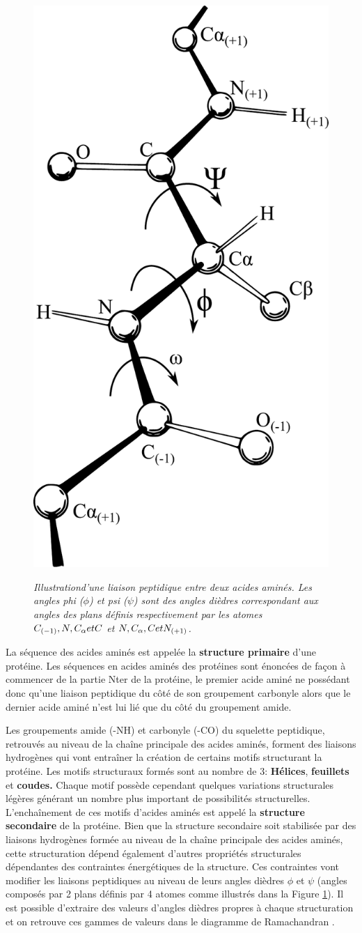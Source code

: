 

\begin{figure}
  \centering
  {\includegraphics[width=0.3\linewidth]{./figures/ch1/phi_psi.pdf}}
    \caption{\it Illustration\protect\footnotemark d'une liaison peptidique entre deux acides aminés. Les angles phi ($\phi$) et psi ($\psi$) sont des angles dièdres correspondant aux angles des plans définis respectivement par les atomes $ C_{(-1)}, N, C_\protect\alpha et C$ et $N, C_\protect\alpha, C et N_{(+1)}$.}
    \label{Fig:phi_psi}
  \hspace{0.3cm}
\end{figure}


La séquence des acides aminés est appelée la \textbf{structure primaire} d'une protéine. Les séquences en acides aminés des protéines sont énoncées de façon à commencer de la partie Nter de la protéine, le premier acide aminé ne possédant donc qu'une liaison peptidique du côté de son groupement carbonyle alors que le dernier acide aminé n'est lui lié que du côté du groupement amide.

Les groupements amide (-NH) et carbonyle (-CO) du squelette peptidique, retrouvés au niveau de la chaîne principale des acides aminés, forment des liaisons hydrogènes qui vont entraîner la création de certains motifs structurant la protéine. Les motifs structuraux formés sont au nombre de 3: \textbf{Hélices}, \textbf{feuillets} et \textbf{coudes.} Chaque motif possède cependant quelques variations structurales légères générant un nombre plus important de possibilités structurelles. L’enchaînement de ces motifs d'acides aminés est appelé la \textbf{structure secondaire} de la protéine. Bien que la structure secondaire soit stabilisée par des liaisons hydrogènes formée au niveau de la chaîne principale des acides aminés, cette structuration dépend également d'autres propriétés structurales dépendantes des contraintes énergétiques de la structure. Ces contraintes vont modifier les liaisons peptidiques au niveau de leurs angles dièdres $\phi$ et $\psi$ (angles composés par 2 plans définis par 4 atomes comme illustrés dans la Figure \ref{Fig:phi_psi}). Il est possible d'extraire des valeurs d'angles dièdres propres à chaque structuration et on retrouve ces gammes de valeurs dans le diagramme de Ramachandran \cite{ramachandran1968conformation}.

